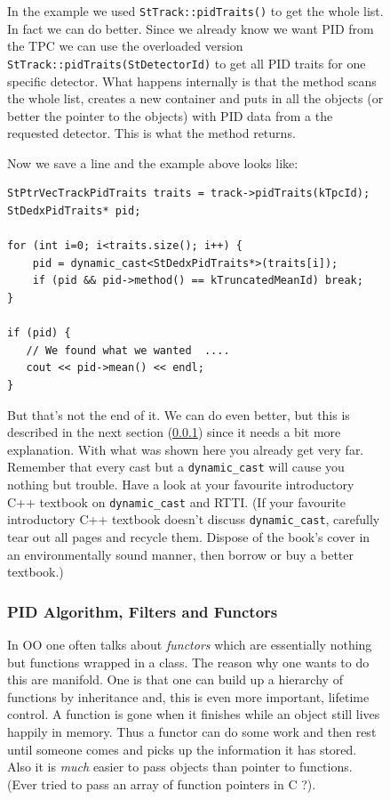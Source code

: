 \documentclass[twoside]{article}
\begin{document}
\begin{figure}[htb]
\begin{center}
In the example we used \texttt{StTrack::pidTraits()} to get the whole
list. In fact we can do better.  Since we already know we want PID
from the TPC we can use the overloaded version
\texttt{StTrack::pidTraits(StDetectorId)} to get all PID traits for
one specific detector.  What happens internally is that the method
scans the whole list, creates a new container and puts in all the
objects (or better the pointer to the objects) with PID data from a
the requested detector. This is what the method returns.

Now we save a line and the example above looks like:
\begin{verbatim}
StPtrVecTrackPidTraits traits = track->pidTraits(kTpcId);
StDedxPidTraits* pid;

for (int i=0; i<traits.size(); i++) {
    pid = dynamic_cast<StDedxPidTraits*>(traits[i]);
    if (pid && pid->method() == kTruncatedMeanId) break;
}

if (pid) {
   // We found what we wanted  ....
   cout << pid->mean() << endl;
}
\end{verbatim}

But that's not the end of it. We can do even better, but this is
described in the next section (\ref{sec:pidAlgorithm}) since it needs
a bit more explanation. With what was shown here you already get very
far. Remember that every cast but a \texttt{dynamic\_cast} will cause
you nothing but trouble. Have a look at your favourite introductory
C++ textbook on \texttt{dynamic\_cast} and RTTI.  (If your favourite
introductory C++ textbook doesn't discuss \texttt{dynamic\_cast},
carefully tear out all pages and recycle them.  Dispose of the book's
cover in an environmentally sound manner, then borrow or buy a better
textbook.)

\subsubsection{PID Algorithm, Filters and Functors}
\label{sec:pidAlgorithm}
  
 In OO one often talks about
\emph{functors} which are essentially nothing but functions wrapped in
a class. The reason why one wants to do this are manifold. One is that
one can build up a hierarchy of functions by inheritance and, this is
even more important, lifetime control. A function is gone when it
finishes while an object still lives happily in memory. Thus a functor
can do some work and then rest until someone comes and picks up the
information it has stored.  Also it is \emph{much} easier to pass
objects than pointer to functions. (Ever tried to pass an array of
function pointers in C ?).


\end{center}
\end{figure}
\end{document}

